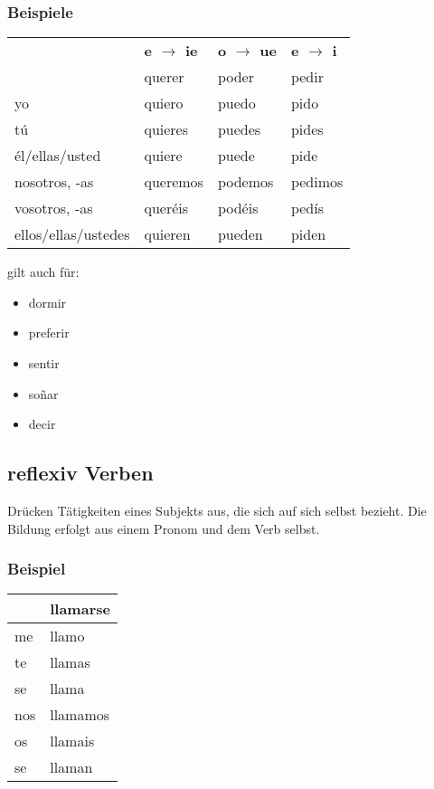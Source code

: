 \documentclass[10pt,spanish]{report}
\begin{document}
\subsubsection*{Beispiele}
\begin{longtable}{p{} | C{.10\textwidth}  | C{.10\textwidth}  | C{.10\textwidth}} 
~ & \textbf{e $\rightarrow$ ie} & \textbf{o $\rightarrow$ ue} & \textbf{e $\rightarrow$ i}\\
~ & querer & poder & pedir                                   \\ \hline
\hline
\endhead %
yo & quiero & puedo & pido \\
tú & quieres & puedes &  pides \\
él/ellas/usted &  quiere & puede &  pide \\
nosotros, -as &  queremos & podemos &  pedimos \\
vosotros, -as &  queréis & podéis &  pedís \\
ellos/ellas/ustedes &  quieren & pueden &  piden \\
\end{longtable}

gilt auch für:
\begin{itemize}
  \item dormir
  \item preferir
  \item sentir
  \item so\~{n}ar
  \item decir
\end{itemize}
\newpage

\subsection*{reflexiv Verben}
Drücken Tätigkeiten eines Subjekts aus, die sich auf sich selbst bezieht. Die Bildung erfolgt aus einem Pronom und dem Verb selbst.

\subsubsection*{Beispiel}
\begin{longtable}{p{} | p{}} 
\textbf{~}     & llamarse                                      \\ \hline
\hline
\endhead %
me & llamo \\
te & llamas \\
se & llama \\
nos & llamamos \\
os & llamais \\
se & llaman \\
\end{longtable}
\end{document}
